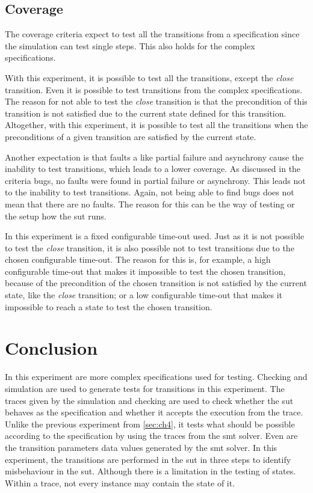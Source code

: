 \subsection{Coverage}

The coverage criteria expect to test all the transitions from a
specification since the simulation can test single steps. This also holds
for the complex specifications.

With this experiment, it is possible to test all the transitions, except the
\textit{close} transition. Even it is possible to test transitions from the
complex specifications. The reason for not able to test the \textit{close}
transition is that the precondition of this transition is not satisfied due to
the current state defined for this transition. Altogether, with this experiment,
it is possible to test all the transitions when the preconditions of a given
transition are satisfied by the current state.

Another expectation is that faults a like partial failure and asynchrony cause
the inability to test transitions, which leads to a lower coverage. As discussed
in the criteria bugs, no faults were found in partial failure or asynchrony.
This leads not to the inability to test transitions. Again, not being able to
find bugs does not mean that there are no faults. The reason for this can be the
way of testing or the setup how the \gls{sut} runs.

In this experiment is a fixed configurable time-out used. Just as it is not
possible to test the \textit{close} transition, it is also possible not to test
transitions due to the chosen configurable time-out.
The reason for this is, for example, a high configurable time-out that makes it
impossible to test the chosen transition, because of the precondition of the
chosen transition is not satisfied by the current state, like the \textit{close}
transition; or a low configurable time-out that makes it impossible to reach a
state to test the chosen transition.

\section{Conclusion}
In this experiment are more complex specifications used for testing.
Checking and simulation are used to generate tests for transitions in this
experiment. The traces given by the simulation and checking are used to check
whether the \gls{sut} behaves as the specification and whether it accepts the
execution from the trace. Unlike the previous experiment from
\autoref{sec:ch4}, it tests what should be possible according to the
specification by using the traces from the \gls{smt} solver. Even are the transition
parameters data values generated by the \gls{smt} solver. In this experiment,
the transitions are performed in the \gls{sut} in three steps to identify misbehaviour in
the \gls{sut}. Although there is a limitation in the testing of states. Within a
trace, not every instance may contain the state of it.

